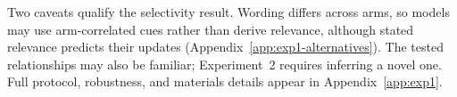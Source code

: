 Two caveats qualify the selectivity result. Wording differs across arms, so models
may use arm-correlated cues rather than derive relevance, although stated relevance
predicts their updates (Appendix~\ref{app:exp1-alternatives}). The tested
relationships may also be familiar; Experiment~2 requires inferring a novel one.
Full protocol, robustness, and materials details appear in
Appendix~\ref{app:exp1}.

